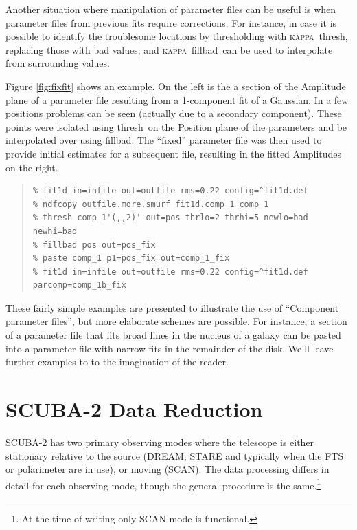 \documentclass[twoside,11pt]{article}
\newcommand{\xref}[3]{#1}
\newcommand{\xlabel}[1]{}
\renewcommand{\_}{\texttt{\symbol{95}}}
\newenvironment{myquote}{\begin{quote}\begin{small}}{\end{small}\end{quote}}
\newcommand{\KAPPA}{\textsc{kappa}}
\newcommand{\task}[1]{\textsf{#1}}
\newcommand{\fillbad}{\xref{\task{fillbad}}{sun95}{FILLBAD}}
\newcommand{\thresh}{\xref{\task{thresh}}{sun95}{THRESH}}
\begin{document}
Another situation where manipulation of parameter files can be useful
is when parameter files from previous fits require corrections. For
instance, in case it is possible to identify the troublesome locations
by thresholding with \KAPPA\ \thresh, replacing those with bad values; and
\KAPPA\ \fillbad\ can be used to interpolate from surrounding values.

Figure \ref{fig:fixfit} shows an example. On the left is the a section
of the Amplitude plane of a parameter file resulting from a
1-component fit of a Gaussian. In a few positions problems can be seen
(actually due to a secondary component).  These points were isolated
using \thresh\ on the Position plane of the parameters and be
interpolated over using \fillbad. The ``fixed'' parameter file was
then used to provide initial estimates for a subsequent file,
resulting in the fitted Amplitudes on the right.

\begin{myquote}
\begin{verbatim}
% fit1d in=infile out=outfile rms=0.22 config=^fit1d.def
% ndfcopy outfile.more.smurf_fit1d.comp_1 comp_1
% thresh comp_1'(,,2)' out=pos thrlo=2 thrhi=5 newlo=bad newhi=bad
% fillbad pos out=pos_fix
% paste comp_1 p1=pos_fix out=comp_1_fix
% fit1d in=infile out=outfile rms=0.22 config=^fit1d.def parcomp=comp_1b_fix
\end{verbatim}
\end{myquote}

These fairly simple examples are presented to illustrate the use of
``Component parameter files'', but more elaborate schemes are
possible. For instance, a section of a parameter file that fits broad
lines in the nucleus of a galaxy can be pasted into a parameter file
with narrow fits in the remainder of the disk. We'll leave further
examples to to the imagination of the reader.

\section{\xlabel{scuba2}SCUBA-2 Data Reduction\label{se:sc2dr}}

SCUBA-2 has two primary observing modes where the telescope is either
stationary relative to the source (DREAM, STARE and typically when the
FTS or polarimeter are in use), or moving (SCAN). The data processing
differs in detail for each observing mode, though the general
procedure is the same.\footnote{At the time of writing only SCAN mode
  is functional.}
\end{document}
